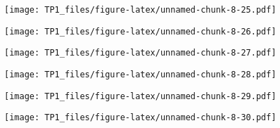 \documentclass[
]{article}
\newenvironment{Shaded}{\begin{snugshade}}{\end{snugshade}}
\newcommand{\DataTypeTok}[1]{\textcolor[rgb]{0.13,0.29,0.53}{#1}}
\newcommand{\KeywordTok}[1]{\textcolor[rgb]{0.13,0.29,0.53}{\textbf{#1}}}
\newcommand{\NormalTok}[1]{#1}
\newcommand{\OperatorTok}[1]{\textcolor[rgb]{0.81,0.36,0.00}{\textbf{#1}}}
\newcommand{\StringTok}[1]{\textcolor[rgb]{0.31,0.60,0.02}{#1}}
\begin{document}
\texttt{[image: TP1\_files/figure-latex/unnamed-chunk-8-25.pdf]}

\begin{Shaded}
\end{Shaded}

\texttt{[image: TP1\_files/figure-latex/unnamed-chunk-8-26.pdf]}

\begin{Shaded}
\end{Shaded}

\texttt{[image: TP1\_files/figure-latex/unnamed-chunk-8-27.pdf]}

\begin{Shaded}
\end{Shaded}

\texttt{[image: TP1\_files/figure-latex/unnamed-chunk-8-28.pdf]}

\begin{Shaded}
\end{Shaded}

\texttt{[image: TP1\_files/figure-latex/unnamed-chunk-8-29.pdf]}

\begin{Shaded}
\end{Shaded}

\texttt{[image: TP1\_files/figure-latex/unnamed-chunk-8-30.pdf]}
\end{document}
